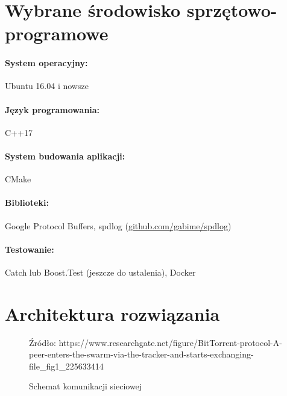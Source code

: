 \documentclass[11pt]{article}
\begin{document}
\section{Wybrane środowisko sprzętowo-programowe}
\paragraph{System operacyjny:}
Ubuntu 16.04 i nowsze
\paragraph{Język programowania:}
 C++17
\paragraph{System budowania aplikacji:}
CMake
\paragraph{Biblioteki:}
Google Protocol Buffers, spdlog (\url{github.com/gabime/spdlog})
\paragraph{Testowanie:}
Catch lub Boost.Test (jeszcze do ustalenia), Docker
\section{Architektura rozwiązania}
\begin{figure}[h]
\caption{Schemat komunikacji sieciowej}
\centering
{}
{Źródło: https://www.researchgate.net/figure/BitTorrent-protocol-A-peer-enters-the-swarm-via-the-tracker-and-starts-exchanging-file\_fig1\_225633414}
\end{figure}
\clearpage
\end{document}
